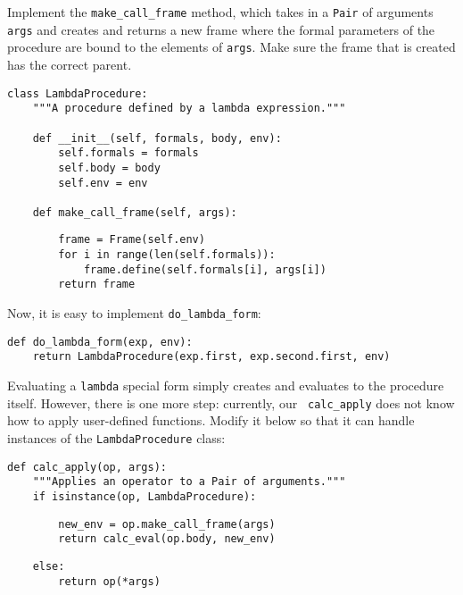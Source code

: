 Implement the {\tt make\_call\_frame} method, which takes in a {\tt Pair} of
arguments {\tt args} and creates and returns a new frame where the formal
parameters of the procedure are bound to the elements of {\tt args}. Make sure
the frame that is created has the correct parent.\\

\begin{lstlisting}
class LambdaProcedure:
    """A procedure defined by a lambda expression."""

    def __init__(self, formals, body, env):
        self.formals = formals
        self.body = body
        self.env = env

    def make_call_frame(self, args):
\end{lstlisting}
\begin{solution}[1.5in]
\begin{lstlisting}
        frame = Frame(self.env)
        for i in range(len(self.formals)):
            frame.define(self.formals[i], args[i])
        return frame
\end{lstlisting}
\end{solution}

\clearpage

Now, it is easy to implement {\tt do\_lambda\_form}:\\

\begin{lstlisting}
def do_lambda_form(exp, env):
    return LambdaProcedure(exp.first, exp.second.first, env)
\end{lstlisting}

Evaluating a {\tt lambda} special form simply creates and evaluates to the
procedure itself. However, there is one more step: currently, our {\tt
calc\_apply} does not know how to apply user-defined functions. Modify it below
so that it can handle instances of the {\tt LambdaProcedure} class:\\

\begin{lstlisting}
def calc_apply(op, args):
    """Applies an operator to a Pair of arguments."""
    if isinstance(op, LambdaProcedure):
\end{lstlisting}
\begin{solution}[1in]
\begin{lstlisting}
        new_env = op.make_call_frame(args)
        return calc_eval(op.body, new_env)
\end{lstlisting}
\end{solution}
\begin{lstlisting}
    else:
        return op(*args)
\end{lstlisting}

